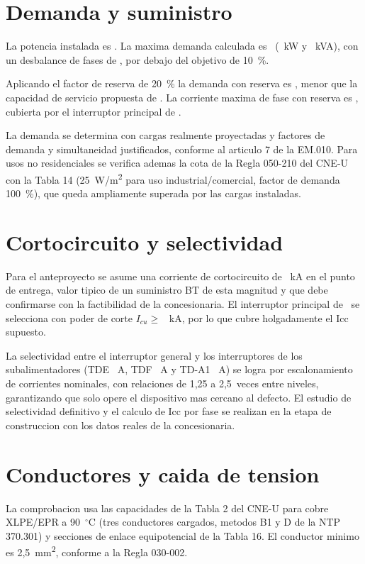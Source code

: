 \section{Demanda y suministro}
La potencia instalada es \PI. La maxima demanda calculada es
\MD~(\MDkw~kW y \MDkva~kVA), con un desbalance de fases de \Desb, por debajo
del objetivo de 10~\%.

Aplicando el factor de reserva de 20~\% la demanda con reserva es \MDReserva,
menor que la capacidad de servicio propuesta de \ServCap. La corriente maxima
de fase con reserva es \Ipase, cubierta por el interruptor principal de
\IPrincipal.

La demanda se determina con cargas realmente proyectadas y factores de demanda
y simultaneidad justificados, conforme al articulo 7 de la EM.010. Para usos
no residenciales se verifica ademas la cota de la Regla 050-210 del CNE-U con
la Tabla 14 (25~W/m\textsuperscript{2} para uso industrial/comercial, factor
de demanda 100~\%), que queda ampliamente superada por las cargas instaladas.

\section{Cortocircuito y selectividad}
Para el anteproyecto se asume una corriente de cortocircuito de
\IccAsumido~kA en el punto de entrega, valor tipico de un suministro BT de
esta magnitud y que debe confirmarse con la factibilidad de la concesionaria.
El interruptor principal de \IPrincipal~se selecciona con poder de corte
\(I_{cu} \geq\) \Icu~kA, por lo que cubre holgadamente el Icc supuesto.

La selectividad entre el interruptor general y los interruptores de los
subalimentadores (TDE \ITMAlTDE~A, TDF \ITMAlTDF~A y TD-A1 \ITMAlTDA~A) se logra
por escalonamiento de corrientes nominales, con relaciones de 1,25 a 2,5~veces
entre niveles, garantizando que solo opere el dispositivo mas cercano al
defecto. El estudio de selectividad definitivo y el calculo de Icc por fase se
realizan en la etapa de construccion con los datos reales de la concesionaria.

\section{Conductores y caida de tension}
La comprobacion usa las capacidades de la Tabla 2 del CNE-U para cobre
XLPE/EPR a 90~\({}^\circ\)C (tres conductores cargados, metodos B1 y D de la
NTP 370.301) y secciones de enlace equipotencial de la Tabla 16. El conductor
minimo es 2,5~mm\textsuperscript{2}, conforme a la Regla 030-002.

